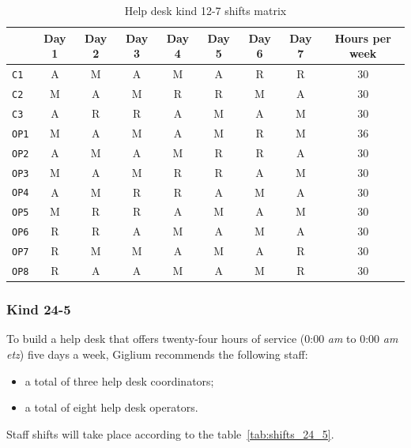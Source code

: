 \begin{table}[H]
	\centering
	\begin{tabular}{|l|c|c|c|c|c|c|c|c|} 
		\hline
		& \textbf{Day 1} & \textbf{Day 2} & \textbf{Day 3} & \textbf{Day 4} & \textbf{Day 5} & \textbf{Day 6} & \textbf{Day 7} & \textbf{Hours per week}\\ 
		\hline
		\texttt{C1} & A & M & A & M & A & R & R & 30\\
		\hline
		\texttt{C2} & M & A & M & R & R & M & A & 30\\
		\hline
		\texttt{C3} & A & R & R & A & M & A & M & 30\\
		\hline
		\texttt{OP1} & M & A & M & A & M & R & M & 36\\
		\hline
		\texttt{OP2} & A & M & A & M & R & R & A & 30\\
		\hline
		\texttt{OP3} & M & A & M & R & R & A & M & 30\\
		\hline
		\texttt{OP4} & A & M & R & R & A & M & A & 30\\
		\hline
		\texttt{OP5} & M & R & R & A & M & A & M & 30\\
		\hline
		\texttt{OP6} & R & R & A & M & A & M & A & 30\\
		\hline
		\texttt{OP7} & R & M & M & A & M & A & R & 30\\
		\hline
		\texttt{OP8} & R & A & A & M & A & M & R & 30\\
		\hline
	\end{tabular}
	\caption{Help desk kind 12{-}7 shifts matrix}\label{tab:shifts_12_7}
\end{table}

\subsubsection{Kind 24{-}5}\label{24_5}
To build a help desk that offers twenty-four hours of service (0:00 \textit{\gls{am}} to 0:00 \textit{\gls{am}} \textit{\gls{etz}}) five days a week, Giglium recommends the following staff:
\begin{itemize}
	\item a total of three help desk coordinators;
	\item a total of eight help desk operators.
\end{itemize}

\noindent Staff shifts will take place according to the table~\ref{tab:shifts_24_5}.

